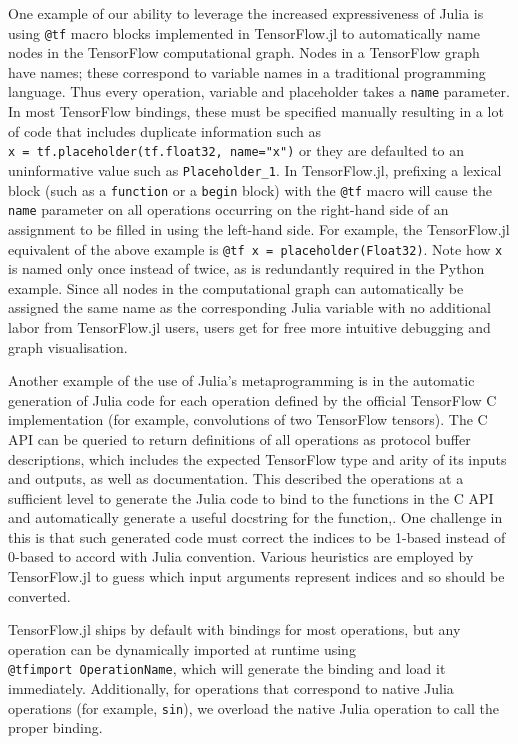 \documentclass{book}
\begin{document}
One example of our ability to leverage the increased expressiveness of
Julia is using \texttt{@tf} macro blocks implemented in TensorFlow.jl to
automatically name nodes in the TensorFlow computational graph. Nodes in
a TensorFlow graph have names; these correspond to variable names in a
traditional programming language. Thus every operation, variable and
placeholder takes a \texttt{name} parameter. In most TensorFlow
bindings, these must be specified manually resulting in a lot of code
that includes duplicate information such as
\texttt{x\ =\ tf.placeholder(tf.float32,\ name="x")} or they are
defaulted to an uninformative value such as \texttt{Placeholder\_1}. In
TensorFlow.jl, prefixing a lexical block (such as a \texttt{function} or
a \texttt{begin} block) with the \texttt{@tf} macro will cause the
\texttt{name} parameter on all operations occurring on the right-hand
side of an assignment to be filled in using the left-hand side. For
example, the TensorFlow.jl equivalent of the above example is
\texttt{@tf\ x\ =\ placeholder(Float32)}. Note how \texttt{x} is named
only once instead of twice, as is redundantly required in the Python
example. Since all nodes in the computational graph can automatically be
assigned the same name as the corresponding Julia variable with no
additional labor from TensorFlow.jl users, users get for free more
intuitive debugging and graph visualisation.

Another example of the use of Julia's metaprogramming is in the
automatic generation of Julia code for each operation defined by the
official TensorFlow C implementation (for example, convolutions of two
TensorFlow tensors). The C API can be queried to return definitions of
all operations as protocol buffer descriptions, which includes the
expected TensorFlow type and arity of its inputs and outputs, as well as
documentation. This described the operations at a sufficient level to
generate the Julia code to bind to the functions in the C API and
automatically generate a useful docstring for the function,. One
challenge in this is that such generated code must correct the indices
to be 1-based instead of 0-based to accord with Julia convention.
Various heuristics are employed by TensorFlow.jl to guess which input
arguments represent indices and so should be converted.

TensorFlow.jl ships by default with bindings for most operations, but
any operation can be dynamically imported at runtime using
\texttt{@tfimport\ OperationName}, which will generate the binding and
load it immediately. Additionally, for operations that correspond to
native Julia operations (for example, \texttt{sin}), we overload the
native Julia operation to call the proper binding.
\end{document}
